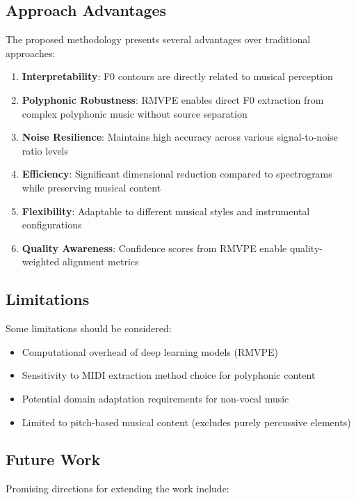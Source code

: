 \documentclass[12pt,a4paper]{article}
\begin{document}
\subsection{Approach Advantages}

The proposed methodology presents several advantages over traditional approaches:

\begin{enumerate}
    \item \textbf{Interpretability}: F0 contours are directly related to musical perception
    \item \textbf{Polyphonic Robustness}: RMVPE enables direct F0 extraction from complex polyphonic music without source separation
    \item \textbf{Noise Resilience}: Maintains high accuracy across various signal-to-noise ratio levels
    \item \textbf{Efficiency}: Significant dimensional reduction compared to spectrograms while preserving musical content
    \item \textbf{Flexibility}: Adaptable to different musical styles and instrumental configurations
    \item \textbf{Quality Awareness}: Confidence scores from RMVPE enable quality-weighted alignment metrics
\end{enumerate}

\subsection{Limitations}

Some limitations should be considered:

\begin{itemize}
    \item Computational overhead of deep learning models (RMVPE)
    \item Sensitivity to MIDI extraction method choice for polyphonic content
    \item Potential domain adaptation requirements for non-vocal music
    \item Limited to pitch-based musical content (excludes purely percussive elements)
\end{itemize}

\subsection{Future Work}

Promising directions for extending the work include:
\end{document}
